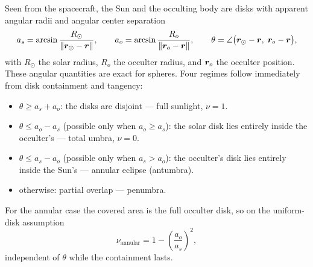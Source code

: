 Seen from the spacecraft, the Sun and the occulting body are disks with
apparent angular radii and angular center separation
\begin{equation}
  a_{s} = \arcsin \frac{R_{\odot}}{\left\lVert \bm{r}_{\odot} - \bm{r} \right\rVert},
  \qquad
  a_{o} = \arcsin \frac{R_{o}}{\left\lVert \bm{r}_{o} - \bm{r} \right\rVert},
  \qquad
  \theta = \angle\bigl( \bm{r}_{\odot} - \bm{r},\;
                        \bm{r}_{o} - \bm{r} \bigr),
  \label{eq:srp:appgeom}
\end{equation}
with $R_{\odot}$ the solar radius, $R_{o}$ the occulter radius, and
$\bm{r}_{o}$ the occulter position. These angular quantities are exact
for spheres. Four regimes follow immediately from disk containment and
tangency:
\begin{itemize}
  \item $\theta \geq a_{s} + a_{o}$: the disks are disjoint --- full
    sunlight, $\nu = 1$.
  \item $\theta \leq a_{o} - a_{s}$ (possible only when
    $a_{o} \geq a_{s}$): the solar disk lies entirely inside the
    occulter's --- total umbra, $\nu = 0$.
  \item $\theta \leq a_{s} - a_{o}$ (possible only when
    $a_{s} > a_{o}$): the occulter's disk lies entirely inside the
    Sun's --- annular eclipse (antumbra).
  \item otherwise: partial overlap --- penumbra.
\end{itemize}

For the annular case the covered area is the full occulter disk, so on
the uniform-disk assumption
\begin{equation}
  \nu_{\mathrm{annular}} = 1 - \left( \frac{a_{o}}{a_{s}} \right)^{2},
  \label{eq:srp:annular}
\end{equation}
independent of $\theta$ while the containment lasts.

